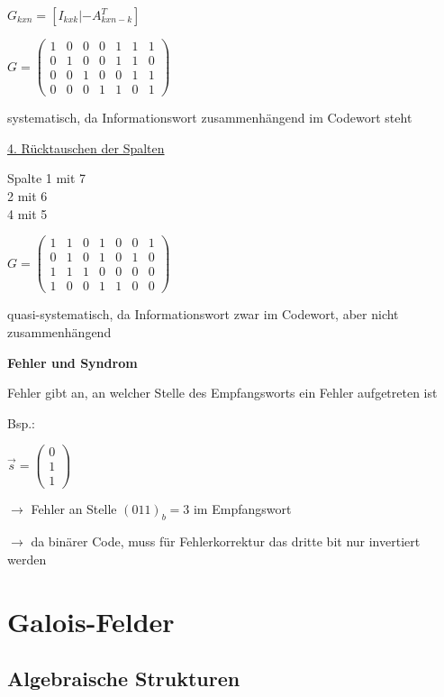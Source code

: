 $G_{k x n} = [I_{k x k} | -A^T_{k x n-k} ]$

$\displaystyle{
    G = \begin{pmatrix}
        1 & 0 & 0 & 0 & 1 & 1 & 1\\
        0 & 1 & 0 & 0 & 1 & 1 & 0\\
        0 & 0 & 1 & 0 & 0 & 1 & 1\\
        0 & 0 & 0 & 1 & 1 & 0 & 1
    \end{pmatrix}
}$

systematisch, da Informationswort zusammenhängend im Codewort steht

\underline{4. Rücktauschen der Spalten}

Spalte 1 mit 7\\
2 mit 6\\
4 mit 5

$\displaystyle{
    G = \begin{pmatrix}
        1 & 1 & 0 & 1 & 0 & 0 & 1\\
        0 & 1 & 0 & 1 & 0 & 1 & 0\\
        1 & 1 & 1 & 0 & 0 & 0 & 0\\
        1 & 0 & 0 & 1 & 1 & 0 & 0
    \end{pmatrix}
}$

quasi-systematisch, da Informationswort zwar im Codewort, aber nicht zusammenhängend

\textbf{Fehler und Syndrom}

Fehler gibt an, an welcher Stelle des Empfangsworts ein Fehler aufgetreten ist

Bsp.:

$\displaystyle{
    \vec{s} = \begin{pmatrix}
        0\\
        1\\
        1
    \end{pmatrix}
}$

$\rightarrow$ Fehler an Stelle $(011)_b = 3$ im Empfangswort

$\rightarrow$ da binärer Code, muss für Fehlerkorrektur das dritte bit nur invertiert werden

\section{Galois-Felder}
\label{sec:galois}

\subsection{Algebraische Strukturen}

